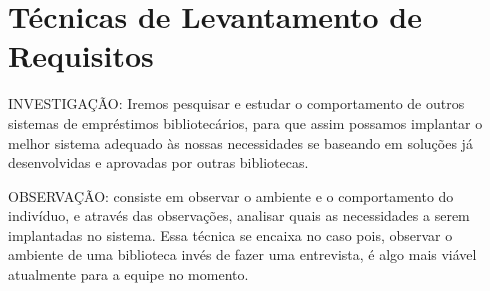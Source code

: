 \chapter{Técnicas de Levantamento de Requisitos}

INVESTIGAÇÃO: Iremos pesquisar e estudar o comportamento de outros sistemas de empréstimos bibliotecários, para que assim possamos implantar o melhor sistema adequado às nossas necessidades se baseando em soluções já desenvolvidas e aprovadas por outras bibliotecas.



OBSERVAÇÃO:  consiste em observar o ambiente e o comportamento do indivíduo, e através das observações, analisar quais as necessidades a serem implantadas no sistema. Essa técnica se encaixa no caso pois, observar o ambiente de uma biblioteca invés de fazer uma entrevista, é algo mais viável atualmente para a equipe no momento.
